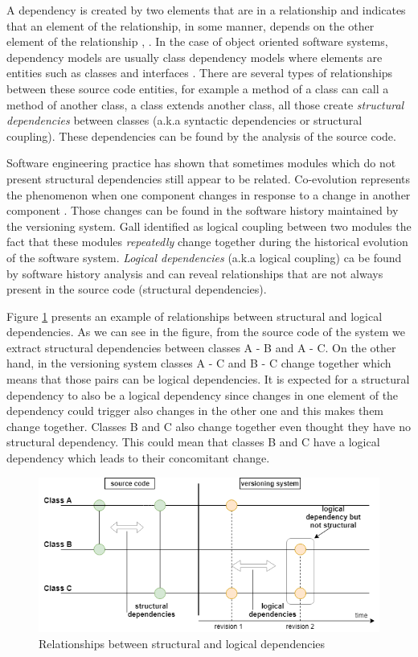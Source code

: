 \documentclass[conference]{IEEEtran}
\begin{document}
A dependency is created by two elements that are in a relationship and indicates that an element of the relationship, in some manner, depends on the other element of the relationship \cite{Booch:2004:OAD:975416}, \cite{Cataldo2009SoftwareDW}. In the case of object oriented software systems, dependency models are usually class dependency models where elements are entities such as classes and interfaces \cite{Sangal:2005:UDM:1094811.1094824}. There are several types of relationships between these source code entities, for example a method of a class can call a method of another class, a class extends another class, all those create  \textit{structural dependencies} between classes (a.k.a syntactic dependencies or structural coupling). These dependencies can be found by the analysis of the source code.

Software engineering practice has shown that sometimes modules which do not present structural dependencies still appear to be related. Co-evolution represents the phenomenon when one component changes in response to a change in another component \cite{Yu:2007:UCC:1231330.1231370}. Those changes can be found in the software history maintained by the versioning system. Gall \cite{Gall:1998:DLC:850947.853338} identified as logical coupling between two modules the fact that these modules  \textit{repeatedly} change together during the historical evolution of the software system. 
 \textit{Logical dependencies} (a.k.a logical coupling) ca be found by software history analysis and can reveal relationships that are not always present in the source code (structural dependencies).  

Figure \ref{fig:fig1} presents an example of relationships between structural and logical dependencies. As we can see in the figure, from the source code of the system we extract structural dependencies between classes A - B and A - C. On the other hand, in the versioning  system classes A - C and B - C change together which means that those pairs can be logical dependencies. It is expected for a structural dependency to also be a logical dependency since changes in one element of the dependency could trigger also changes in the other one and this makes them change together. Classes B and C also change together even thought they have no structural dependency. This could mean that classes B and C have a logical dependency which leads to their concomitant change.
\begin{figure}[h]
\includegraphics[scale=0.43]{fig1.png}
\caption{Relationships between structural and logical dependencies }
\label{fig:fig1}
\centering
\end{figure}
\end{document}
